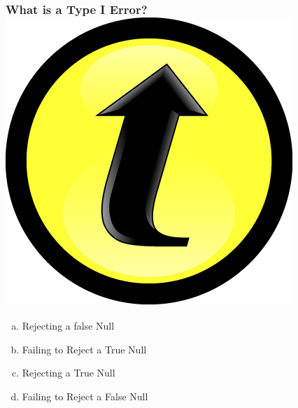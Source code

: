 \documentclass[handout]{beamer}
\begin{document}





\begin{frame}
\frametitle{What is a Type I Error? \includegraphics[scale = 0.05]{./images/clicker}}

\begin{enumerate}[(a)]
	\item Rejecting a false Null
	\item Failing to Reject a True Null
	\item Rejecting a True Null
	\item Failing to Reject a False Null
\end{enumerate}

\end{frame}
\end{document}
